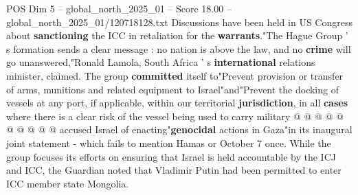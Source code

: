 \begin{textsample}{POS Dim 5 – global\_north\_2025\_01 – Score 18.00 – global\_north\_2025\_01/120718128.txt}
Discussions have been held in US Congress about \textbf{sanctioning} the ICC in retaliation for the \textbf{warrants}."The Hague Group ' s formation sends a clear message : no nation is above the law, and no \textbf{crime} will go unanswered,"Ronald Lamola, South Africa ' s \textbf{international} relations minister, claimed.
The group \textbf{committed} itself to"Prevent provision or transfer of arms, munitions and related equipment to Israel"and"Prevent the docking of vessels at any port, if applicable, within our territorial \textbf{jurisdiction}, in all \textbf{cases} where there is a clear risk of the vessel being used to carry military @ @ @ @ @ @ @ @ @ @ accused Israel of enacting"\textbf{genocidal} actions in Gaza"in its inaugural joint statement - which fails to mention Hamas or October 7 once.
While the group focuses its efforts on ensuring that Israel is held accountable by the ICJ and ICC, the Guardian noted that Vladimir Putin had been permitted to enter ICC member state Mongolia.

\end{textsample}
